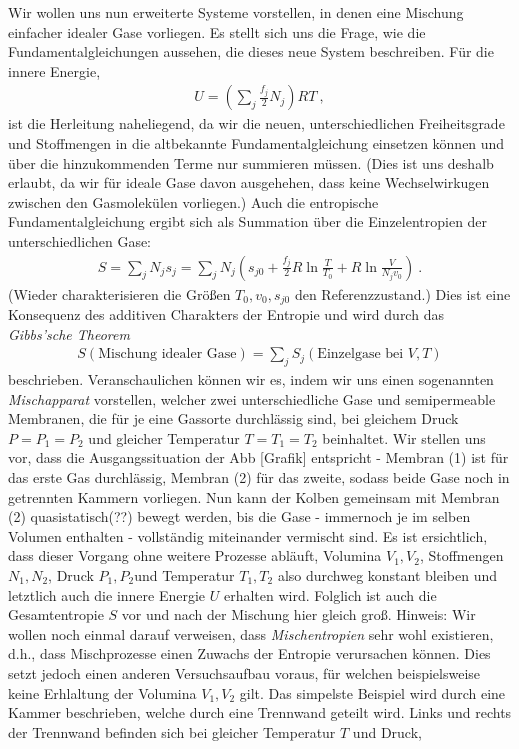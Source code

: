 Wir wollen uns nun erweiterte Systeme vorstellen, in denen eine Mischung einfacher idealer Gase vorliegen. Es stellt sich uns die Frage, wie die Fundamentalgleichungen aussehen, die dieses neue System beschreiben. Für die innere Energie, 
\begin{align*}
    \boxed{U=\left(\sum_j\frac{f_j}{2}N_j\right)RT}\:,
\end{align*}
ist die Herleitung naheliegend, da wir die neuen, unterschiedlichen Freiheitsgrade und Stoffmengen in die altbekannte Fundamentalgleichung einsetzen können und über die hinzukommenden Terme nur summieren müssen. (Dies ist uns deshalb erlaubt, da wir für ideale Gase davon ausgehehen, dass keine Wechselwirkugen zwischen den Gasmolekülen vorliegen.) Auch die entropische Fundamentalgleichung ergibt sich als Summation über die Einzelentropien der unterschiedlichen Gase: 
\begin{align*}
    \boxed{S=\sum_jN_js_j=\sum_jN_j\left(s_{j0}+\frac{f_j}{2}R\ln\frac{T}{T_0}+R\ln\frac{V}{N_jv_0}\right)}\:.
\end{align*}
(Wieder charakterisieren die Größen $T_0,v_0,s_{j0}$ den Referenzzustand.) 
Dies ist eine Konsequenz des additiven Charakters der Entropie und wird durch das \emph{Gibbs’sche Theorem} 
\begin{align*}
    \boxed{S(\text{Mischung idealer Gase})=\sum_jS_j(\text{Einzelgase bei } V,T)}
\end{align*}
beschrieben. Veranschaulichen können wir es, indem wir uns einen sogenannten \emph{Mischapparat} vorstellen, welcher zwei unterschiedliche Gase und semipermeable Membranen, die für je eine Gassorte durchlässig sind, bei gleichem Druck $P=P_1=P_2$ und gleicher Temperatur $T=T_1=T_2$ beinhaltet. Wir stellen uns vor, dass die Ausgangssituation der Abb [Grafik] entspricht - Membran (1) ist für das erste Gas durchlässig, Membran (2) für das zweite, sodass beide Gase noch in getrennten Kammern vorliegen. Nun kann der Kolben gemeinsam mit 
Membran (2) quasistatisch(??) bewegt werden, bis die Gase - immernoch je im selben Volumen enthalten - vollständig miteinander vermischt sind. Es ist ersichtlich, dass dieser Vorgang ohne weitere Prozesse abläuft, Volumina $V_1,V_2$, Stoffmengen $N_1,N_2$, Druck $P_1,P_2$und Temperatur $T_1,T_2$ also durchweg konstant bleiben und letztlich auch die innere Energie $U$ erhalten wird. Folglich ist auch die Gesamtentropie $S$ vor und nach der Mischung hier gleich groß.
Hinweis: Wir wollen noch einmal darauf verweisen, dass \emph{Mischentropien} sehr wohl existieren, d.h., dass Mischprozesse einen Zuwachs der Entropie verursachen können. Dies setzt jedoch einen anderen Versuchsaufbau voraus, für welchen beispielsweise keine Erhlaltung der Volumina $V_1,V_2$ gilt. Das simpelste Beispiel wird durch eine Kammer beschrieben, welche durch eine Trennwand geteilt wird. Links und rechts der Trennwand befinden sich bei gleicher Temperatur $T$ und Druck, 
